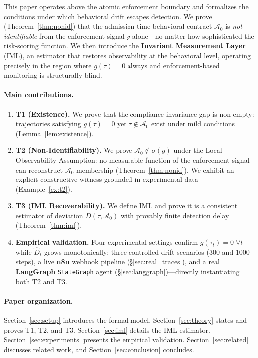 \documentclass[11pt]{article}
\newcommand{\Azero}{\mathcal{A}_0}
\newcommand{\Dhat}{\widehat{D}}
\newcommand{\sigg}{\sigma(g)}
\begin{document}
This paper operates above the atomic enforcement boundary and formalizes
the conditions under which behavioral drift escapes detection.
We prove (Theorem~\ref{thm:nonid}) that the admission-time behavioral
contract $\Azero$ is \emph{not identifiable} from the enforcement signal
$g$ alone---no matter how sophisticated the risk-scoring function.
We then introduce the \textbf{Invariant Measurement Layer} (IML), an
estimator that restores observability at the behavioral level, operating
precisely in the region where $g(\tau) = 0$ always and enforcement-based
monitoring is structurally blind.

\paragraph{Main contributions.}
\begin{enumerate}[leftmargin=1.5em, itemsep=1pt]
  \item \textbf{T1 (Existence).}  We prove that the compliance-invariance
        gap is non-empty: trajectories satisfying $g(\tau)=0$ yet
        $\tau \notin \Azero$ exist under mild conditions
        (Lemma~\ref{lem:existence}).

  \item \textbf{T2 (Non-Identifiability).}  We prove $\Azero \notin \sigg$
        under the Local Observability Assumption: no measurable function of
        the enforcement signal can reconstruct $\Azero$-membership
        (Theorem~\ref{thm:nonid}).  We exhibit an explicit constructive
        witness grounded in experimental data (Example~\ref{ex:t2}).

  \item \textbf{T3 (IML Recoverability).}  We define IML and prove it is a
        consistent estimator of deviation $D(\tau,\Azero)$ with provably
        finite detection delay (Theorem~\ref{thm:iml}).

  \item \textbf{Empirical validation.}  Four experimental settings confirm
        $g(\tau_t)=0\;\forall t$ while $\Dhat_t$ grows monotonically:
        three controlled drift scenarios (300 and 1000 steps), a live
        \textbf{n8n} webhook pipeline (\S\ref{sec:real_traces}), and a
        real \textbf{LangGraph} \texttt{StateGraph} agent
        (\S\ref{sec:langgraph})---directly instantiating both T2 and T3.
\end{enumerate}

\paragraph{Paper organization.}
Section~\ref{sec:setup} introduces the formal model.
Section~\ref{sec:theory} states and proves T1, T2, and T3.
Section~\ref{sec:iml} details the IML estimator.
Section~\ref{sec:experiments} presents the empirical validation.
Section~\ref{sec:related} discusses related work, and
Section~\ref{sec:conclusion} concludes.
\end{document}
